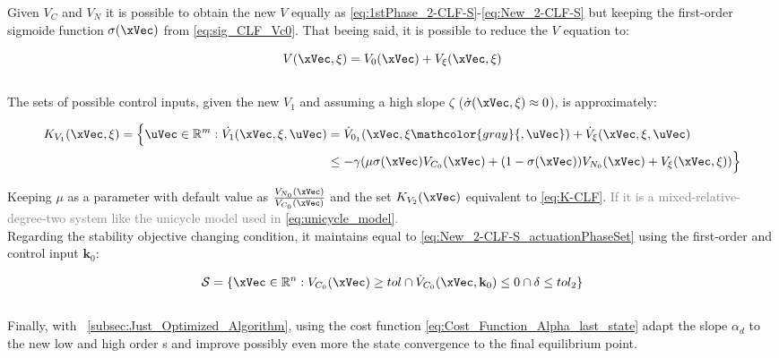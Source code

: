 Given \(V_C\) and \(V_N\) it is possible to obtain the new  \(V\) equally as \ref{eq:1stPhase_2-CLF-S}-\ref{eq:New_2-CLF-S} but keeping the first-order sigmoide function \(\sigma(\xVec)\) from \ref{eq:sig_CLF_Vc0}. That beeing said, it is possible to reduce the  \(V\) equation to:

\begin{equation}
    V(\xVec, \xi) = V_0(\xVec) + V_{\xi}(\xVec, \xi)
    \label{eq:HH_New_2-CLF-S}
\end{equation}\\

The sets of possible control inputs, given the new  \(V_{1}\) and assuming a high slope \(\zeta\) (\(\dot{\sigma}(\xVec, \xi)\approx 0\)), is approximately:


\begin{align}
    K_{V_{1}}(\xVec, \xi) = \Bigl\{\uVec \in \mathbb{R}^m: \dot{V_{1}}(\xVec, \xi, \uVec) &= \dot{V}_{0_1}(\xVec, \xi \mathcolor{gray}{, \uVec}) + \dot{V}_{\xi}(\xVec, \xi, \uVec) \notag \\
    &\leq -\gamma( \mu \sigma(\xVec) V_{C_0}(\xVec) + (1 - \sigma(\xVec))V_{N_0}(\xVec) + V_{\xi}(\xVec, \xi))\Bigr\}
    \label{eq:HH_2-CLF-S_Constraint}
\end{align}

Keeping \(\mu\) as a parameter with default value as \( \frac{V_{N_0}(\xVec)}{V_{C_0}(\xVec)} \) and the set \(K_{V_{2}}(\xVec)\) equivalent to \ref{eq:K-CLF}. \textcolor{gray}{If it is a mixed-relative-degree-two system like the unicycle model used in \ref{eq:unicycle_model}.} \\

Regarding the stability objective changing condition, it maintains equal to \ref{eq:New_2-CLF-S_actuationPhaseSet} using the first-order  and control input \(\mathbf{k}_0\):

\begin{equation}
    \mathcal{S} = \{\xVec \in \mathbb{R}^n: V_{C_0}(\xVec) \geq tol \cap \dot{V}_{C_0}(\xVec, \mathbf{k}_0) \leq 0 \cap \delta \leq tol_2 \}
    \label{eq:HH_New_2-CLF-S_actuationPhaseSet}
\end{equation}\\


Finally, with ~\ref{subsec:Just_Optimized_Algorithm}, using the cost function \ref{eq:Cost_Function_Alpha_last_state} adapt the  slope \(\alpha_d\) to the new low and high order s and improve possibly even more the state convergence to the final equilibrium point.\\

